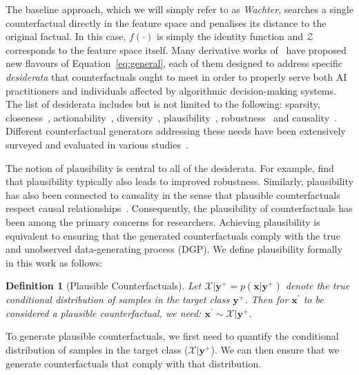 \documentclass[letterpaper]{article} %
\newtheorem{definition}{Definition}[section]
\begin{document}
The baseline approach, which we will simply refer to as \textit{Wachter}, searches a single counterfactual directly in the feature space and penalises its distance to the original factual. In this case, $f(\cdot)$ is simply the identity function and $\mathcal{Z}$ corresponds to the feature space itself. Many derivative works of~\citet{wachter2017counterfactual} have proposed new flavours of Equation~\ref{eq:general}, each of them designed to address specific \textit{desiderata} that counterfactuals ought to meet in order to properly serve both AI practitioners and individuals affected by algorithmic decision-making systems. The list of desiderata includes but is not limited to the following: sparsity, closeness~\citep{wachter2017counterfactual}, actionability~\citep{ustun2019actionable}, diversity~\citep{mothilal2020explaining}, plausibility~\citep{joshi2019realistic,poyiadzi2020face,schut2021generating}, robustness~\citep{upadhyay2021robust,pawelczyk2022probabilistically,altmeyer2023endogenous} and causality~\citep{karimi2021algorithmic}. Different counterfactual generators addressing these needs have been extensively surveyed and evaluated in various studies~\citep{verma2020counterfactual,karimi2020survey,pawelczyk2021carla,artelt2021evaluating,guidotti2022counterfactual}. 

The notion of plausibility is central to all of the desiderata. For example, \citet{artelt2021evaluating} find that plausibility typically also leads to improved robustness. Similarly, plausibility has also been connected to causality in the sense that plausible counterfactuals respect causal relationships~\citep{mahajan2019preserving}. Consequently, the plausibility of counterfactuals has been among the primary concerns for researchers. Achieving plausibility is equivalent to ensuring that the generated counterfactuals comply with the true and unobserved data-generating process (DGP). We define plausibility formally in this work as follows:

\begin{definition}[Plausible Counterfactuals]
  \label{def:plausible}
  Let $\mathcal{X}|\mathbf{y}^+= p(\mathbf{x}|\mathbf{y}^+)$ denote the true conditional distribution of samples in the target class $\mathbf{y}^+$. Then for $\mathbf{x}^{\prime}$ to be considered a plausible counterfactual, we need: $\mathbf{x}^{\prime} \sim \mathcal{X}|\mathbf{y}^+$.
\end{definition}

To generate plausible counterfactuals, we first need to quantify the conditional distribution of samples in the target class ($\mathcal{X}|\mathbf{y}^+$). We can then ensure that we generate counterfactuals that comply with that distribution.
\end{document}
